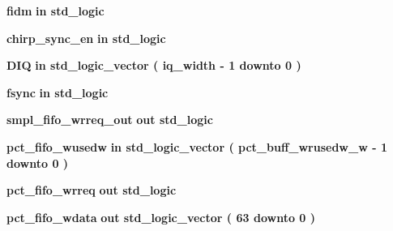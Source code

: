 \begin{DoxyCompactItemize}
\item 
{\bf fidm}  {\bfseries {\bfseries \textcolor{keywordflow}{in}\textcolor{vhdlchar}{ }}} {\bfseries \textcolor{comment}{std\+\_\+logic}\textcolor{vhdlchar}{ }} 
\item 
{\bf chirp\+\_\+sync\+\_\+en}  {\bfseries {\bfseries \textcolor{keywordflow}{in}\textcolor{vhdlchar}{ }}} {\bfseries \textcolor{comment}{std\+\_\+logic}\textcolor{vhdlchar}{ }} 
\item 
{\bf D\+IQ}  {\bfseries {\bfseries \textcolor{keywordflow}{in}\textcolor{vhdlchar}{ }}} {\bfseries \textcolor{comment}{std\+\_\+logic\+\_\+vector}\textcolor{vhdlchar}{ }\textcolor{vhdlchar}{(}\textcolor{vhdlchar}{ }\textcolor{vhdlchar}{ }\textcolor{vhdlchar}{ }\textcolor{vhdlchar}{ }{\bfseries {\bf iq\+\_\+width}} \textcolor{vhdlchar}{-\/}\textcolor{vhdlchar}{ } \textcolor{vhdldigit}{1} \textcolor{vhdlchar}{ }\textcolor{keywordflow}{downto}\textcolor{vhdlchar}{ }\textcolor{vhdlchar}{ } \textcolor{vhdldigit}{0} \textcolor{vhdlchar}{ }\textcolor{vhdlchar}{)}\textcolor{vhdlchar}{ }} 
\item 
{\bf fsync}  {\bfseries {\bfseries \textcolor{keywordflow}{in}\textcolor{vhdlchar}{ }}} {\bfseries \textcolor{comment}{std\+\_\+logic}\textcolor{vhdlchar}{ }} 
\item 
{\bf smpl\+\_\+fifo\+\_\+wrreq\+\_\+out}  {\bfseries {\bfseries \textcolor{keywordflow}{out}\textcolor{vhdlchar}{ }}} {\bfseries \textcolor{comment}{std\+\_\+logic}\textcolor{vhdlchar}{ }} 
\item 
{\bf pct\+\_\+fifo\+\_\+wusedw}  {\bfseries {\bfseries \textcolor{keywordflow}{in}\textcolor{vhdlchar}{ }}} {\bfseries \textcolor{comment}{std\+\_\+logic\+\_\+vector}\textcolor{vhdlchar}{ }\textcolor{vhdlchar}{(}\textcolor{vhdlchar}{ }\textcolor{vhdlchar}{ }\textcolor{vhdlchar}{ }\textcolor{vhdlchar}{ }{\bfseries {\bf pct\+\_\+buff\+\_\+wrusedw\+\_\+w}} \textcolor{vhdlchar}{-\/}\textcolor{vhdlchar}{ } \textcolor{vhdldigit}{1} \textcolor{vhdlchar}{ }\textcolor{keywordflow}{downto}\textcolor{vhdlchar}{ }\textcolor{vhdlchar}{ } \textcolor{vhdldigit}{0} \textcolor{vhdlchar}{ }\textcolor{vhdlchar}{)}\textcolor{vhdlchar}{ }} 
\item 
{\bf pct\+\_\+fifo\+\_\+wrreq}  {\bfseries {\bfseries \textcolor{keywordflow}{out}\textcolor{vhdlchar}{ }}} {\bfseries \textcolor{comment}{std\+\_\+logic}\textcolor{vhdlchar}{ }} 
\item 
{\bf pct\+\_\+fifo\+\_\+wdata}  {\bfseries {\bfseries \textcolor{keywordflow}{out}\textcolor{vhdlchar}{ }}} {\bfseries \textcolor{comment}{std\+\_\+logic\+\_\+vector}\textcolor{vhdlchar}{ }\textcolor{vhdlchar}{(}\textcolor{vhdlchar}{ }\textcolor{vhdlchar}{ } \textcolor{vhdldigit}{63} \textcolor{vhdlchar}{ }\textcolor{keywordflow}{downto}\textcolor{vhdlchar}{ }\textcolor{vhdlchar}{ } \textcolor{vhdldigit}{0} \textcolor{vhdlchar}{ }\textcolor{vhdlchar}{)}\textcolor{vhdlchar}{ }} 

\end{DoxyCompactItemize}
